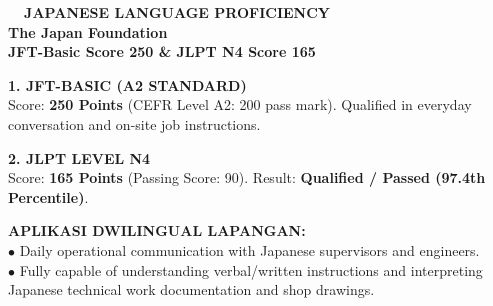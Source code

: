 \documentclass[10pt,a4paper,landscape]{article}
\begin{document}
\noindent
\begin{minipage}[t]{0.30\linewidth}
  \vspace{0pt}
  \begin{tcolorbox}[sharp corners, boxrule=0.8pt, colframe=pborder, colback=white, left=3mm, right=3mm, top=2.5mm, bottom=2.5mm, height=100mm]
    \colorbox{pred}{\fontsize{7pt}{8pt}\selectfont\bfseries\color{white}\ \ JAPANESE LANGUAGE PROFICIENCY\ \ }\\[1.5mm]
    {\fontsize{9.5pt}{11.5pt}\selectfont\bfseries\color{pnavy}The Japan Foundation}\\[0.5mm]
    {\fontsize{7pt}{8.5pt}\selectfont\bfseries\color{pred}JFT-Basic Score 250 \& JLPT N4 Score 165}\\[2mm]

    \begin{tcolorbox}[sharp corners, boxrule=0.5pt, colframe=pborder, colback=pbglight, left=2mm, right=2mm, top=1.5mm, bottom=1.5mm]
      {\fontsize{6.8pt}{8pt}\selectfont\bfseries\color{pnavy}1. JFT-BASIC (A2 STANDARD)}\\[0.3mm]
      {\fontsize{6.5pt}{7.8pt}\selectfont
      Score: \textbf{\color{pred}250 Points} (CEFR Level A2: 200 pass mark). Qualified in everyday conversation and on-site job instructions.
      }
    \end{tcolorbox}
    \vspace{1.2mm}

    \begin{tcolorbox}[sharp corners, boxrule=0.5pt, colframe=pborder, colback=pbglight, left=2mm, right=2mm, top=1.5mm, bottom=1.5mm]
      {\fontsize{6.8pt}{8pt}\selectfont\bfseries\color{pnavy}2. JLPT LEVEL N4}\\[0.3mm]
      {\fontsize{6.5pt}{7.8pt}\selectfont
      Score: \textbf{\color{pred}165 Points} (Passing Score: 90). Result: \textbf{Qualified / Passed (97.4th Percentile)}.
      }
    \end{tcolorbox}
  \end{tcolorbox}
  \vspace{2mm}

  \begin{tcolorbox}[sharp corners, boxrule=0.6pt, colframe=pnavy, colback=pbglight, left=2.5mm, right=2.5mm, top=2mm, bottom=2mm, height=52mm]
    {\fontsize{7pt}{8.5pt}\selectfont\bfseries\color{pnavy}APLIKASI DWILINGUAL LAPANGAN:}\\[1.5mm]
    {\fontsize{6.5pt}{8.2pt}\selectfont\color{psteel}
    $\bullet$ Daily operational communication with Japanese supervisors and engineers.\\
    $\bullet$ Fully capable of understanding verbal/written instructions and interpreting Japanese technical work documentation and shop drawings.
    }
  \end{tcolorbox}
\end{minipage}%
\end{document}

